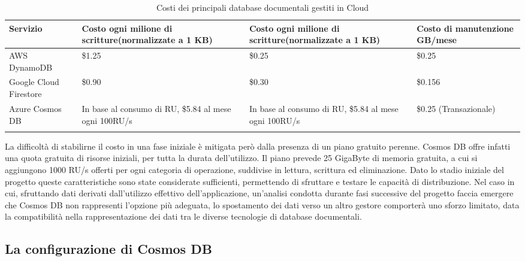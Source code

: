\begin{longtable}{|P{3.2cm}|P{4.2cm}|P{4.2cm}|P{3cm}|}
    \hline
    \textbf{Servizio}      & \textbf{Costo ogni milione di scritture}\newline(normalizzate a 1 KB) & \textbf{Costo ogni milione di scritture}\newline (normalizzate a 1 KB) & \textbf{Costo di manutenzione GB/mese} \\
    \hline
    \endhead
    AWS DynamoDB           & \$1.25                                                                & \$0.25                                                                 & \$0.25                                 \\
    \hline
    Google Cloud Firestore & \$0.90                                                                & \$0.30                                                                 & \$0.156                                \\
    \hline
    Azure Cosmos DB        & In base al consumo di RU, \$5.84 al mese ogni 100RU/s                 & In base al consumo di RU, \$5.84 al mese ogni 100RU/s                  & \$0.25 (Transazionale)                 \\
    \hline
    \caption{Costi dei principali database documentali gestiti in Cloud}
\end{longtable}

La difficoltà di stabilirne il costo in una fase iniziale
è mitigata però dalla presenza di un piano gratuito perenne.
Cosmos DB offre infatti una quota gratuita di risorse iniziali,
per tutta la durata dell'utilizzo.
Il piano prevede 25 GigaByte di memoria gratuita,
a cui si aggiungono 1000 RU/s offerti per ogni categoria di operazione,
suddivise in lettura, scrittura ed eliminazione.
Dato lo stadio iniziale del progetto queste caratteristiche sono state considerate sufficienti,
permettendo di sfruttare e testare le capacità di distribuzione.
Nel caso in cui, sfruttando dati derivati dall'utilizzo effettivo dell'applicazione,
un'analisi condotta durante fasi successive del progetto faccia emergere che
Cosmos DB non rappresenti l’opzione più adeguata,
lo spostamento dei dati verso un altro gestore comporterà uno sforzo limitato,
data la compatibilità nella rappresentazione dei dati tra le diverse tecnologie di database documentali.

\subsection{La configurazione di Cosmos DB}

